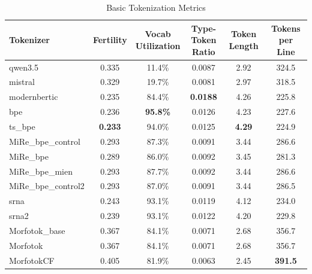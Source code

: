 \begin{table}[htbp]
\centering
\caption{Basic Tokenization Metrics}
\label{tab:basic_metrics}
\begin{tabular}{lccccc}
\toprule
Tokenizer & Fertility & \makecell{Vocab \\ Utilization} & \makecell{Type-Token \\ Ratio} & Token Length & Tokens per Line \\
\midrule
qwen3.5 & 0.335 & 11.4\% & 0.0087 & 2.92 & 324.5 \\
mistral & 0.329 & 19.7\% & 0.0081 & 2.97 & 318.5 \\
modernbertic & 0.235 & 84.4\% & \textbf{0.0188} & 4.26 & 225.8 \\
bpe & 0.236 & \textbf{95.8\%} & 0.0126 & 4.23 & 227.6 \\
ts\_bpe & \textbf{0.233} & 94.0\% & 0.0125 & \textbf{4.29} & 224.9 \\
MiRe\_bpe\_control & 0.293 & 87.3\% & 0.0091 & 3.44 & 286.6 \\
MiRe\_bpe & 0.289 & 86.0\% & 0.0092 & 3.45 & 281.3 \\
MiRe\_bpe\_mien & 0.293 & 87.7\% & 0.0092 & 3.44 & 286.6 \\
MiRe\_bpe\_control2 & 0.293 & 87.0\% & 0.0091 & 3.44 & 286.5 \\
srna & 0.243 & 93.1\% & 0.0119 & 4.12 & 234.0 \\
srna2 & 0.239 & 93.1\% & 0.0122 & 4.20 & 229.8 \\
Morfotok\_base & 0.367 & 84.1\% & 0.0071 & 2.68 & 356.7 \\
Morfotok & 0.367 & 84.1\% & 0.0071 & 2.68 & 356.7 \\
MorfotokCF & 0.405 & 81.9\% & 0.0063 & 2.45 & \textbf{391.5} \\
\bottomrule
\end{tabular}
\end{table}